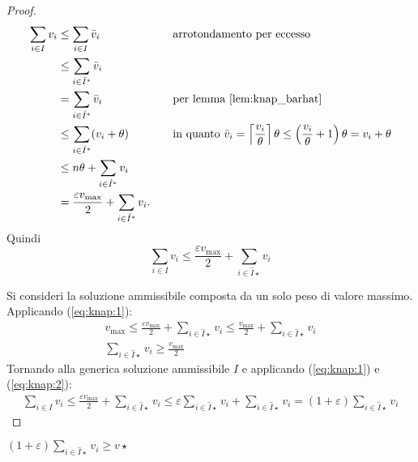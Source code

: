 \begin{proof}
	\begin{align*}
		\sum_{i\in I} v_i & \leq \sum_{i\in I} \bar v_i                                          &  & \quad \text{arrotondamento per eccesso}      \\
		                  & \leq \sum_{ i\in\bar I^*} \bar v_i                                                                                  \\
		                  & = \sum_{ i\in\hat I^*} \bar v_i                                   &  & \quad \text{per lemma \ref{lem:knap_barhat}} \\
		                  & \leq \sum_{i\in\hat I^*} (v_i+\theta)                             &  & \quad \text{in quanto
		$\bar v_i=\left\lceil \frac{v_i}{\theta} \right\rceil\theta\leq\left(\frac{v_i}{\theta}+1\right)\theta=v_i+\theta$}                                          \\
		                  & \leq n\theta+\sum_{i\in\hat I^*} v_i                                                                                \\
		                  & = \frac{\varepsilon v_{\max}}{2} + \sum_{i\in\hat I^*} v_i \text.
	\end{align*}
	Quindi
	\begin{equation}\label{eq:knap:1}
		\sum_{i\in I} v_i \leq \frac{\varepsilon v_{\max}}{2} + \sum_{i\in\hat I\star} v_i
	\end{equation}

	\noindent Si consideri la soluzione ammissibile composta da un solo peso di valore massimo. Applicando (\ref{eq:knap:1}):
	\begin{gather}
		v_{\max} \leq \frac{\varepsilon v_{\max}}{2} + \sum_{i\in\hat I\star} v_i \leq \frac{v_{\max}}{2} + \sum_{i\in\hat I\star} v_i \nonumber \\
		\sum_{i\in\hat I\star} v_i \geq \frac{v_{\max}}{2} \label{eq:knap:2}
	\end{gather}
	Tornando alla generica soluzione ammissibile $I$ e applicando (\ref{eq:knap:1}) e (\ref{eq:knap:2}):
	\begin{gather*}
		\sum_{i\in I} v_i \leq \frac{\varepsilon v_{\max}}{2} + \sum_{i\in\hat I\star} v_i
		\leq \varepsilon\sum_{i\in\hat I\star} v_i + \sum_{i\in\hat I\star} v_i = (1+\varepsilon)\sum_{i\in\hat I\star} v_i
	\end{gather*}
\end{proof}
\begin{corollario}\label{corol:knapapprox}
	$\displaystyle(1+\varepsilon)\sum_{i\in\hat I\star} v_i \geq v\star$
\end{corollario}

